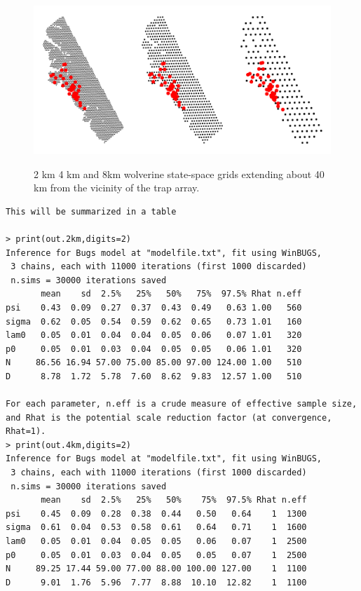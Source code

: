 {\begin{figure}
\begin{center}
\includegraphics[height=2.5in,width=5in]{Ch4/figs/wolvgrids}
\end{center}
\caption{2 km 4 km and 8km wolverine state-space grids extending about
40 km from the vicinity of the trap array. }
\label{scr0.fig.wolvgrids}
\end{figure}

{\small
\begin{verbatim}
This will be summarized in a table

> print(out.2km,digits=2)
Inference for Bugs model at "modelfile.txt", fit using WinBUGS,
 3 chains, each with 11000 iterations (first 1000 discarded)
 n.sims = 30000 iterations saved
       mean    sd  2.5%   25%   50%   75%  97.5% Rhat n.eff
psi    0.43  0.09  0.27  0.37  0.43  0.49   0.63 1.00   560
sigma  0.62  0.05  0.54  0.59  0.62  0.65   0.73 1.01   160
lam0   0.05  0.01  0.04  0.04  0.05  0.06   0.07 1.01   320
p0     0.05  0.01  0.03  0.04  0.05  0.05   0.06 1.01   320
N     86.56 16.94 57.00 75.00 85.00 97.00 124.00 1.00   510
D      8.78  1.72  5.78  7.60  8.62  9.83  12.57 1.00   510

For each parameter, n.eff is a crude measure of effective sample size,
and Rhat is the potential scale reduction factor (at convergence, Rhat=1).
> print(out.4km,digits=2)
Inference for Bugs model at "modelfile.txt", fit using WinBUGS,
 3 chains, each with 11000 iterations (first 1000 discarded)
 n.sims = 30000 iterations saved
       mean    sd  2.5%   25%   50%    75%  97.5% Rhat n.eff
psi    0.45  0.09  0.28  0.38  0.44   0.50   0.64    1  1300
sigma  0.61  0.04  0.53  0.58  0.61   0.64   0.71    1  1600
lam0   0.05  0.01  0.04  0.05  0.05   0.06   0.07    1  2500
p0     0.05  0.01  0.03  0.04  0.05   0.05   0.07    1  2500
N     89.25 17.44 59.00 77.00 88.00 100.00 127.00    1  1100
D      9.01  1.76  5.96  7.77  8.88  10.10  12.82    1  1100


\end{verbatim}}}
